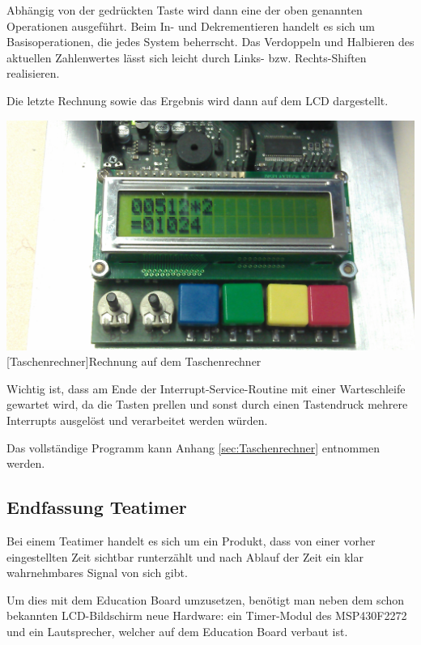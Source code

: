 \documentclass[12pt,a4paper,bibliography=totocnumbered,listof=totocnumbered]{scrartcl}
\begin{document}
\vspace{1em}


\vspace{1em}


Abhängig von der gedrückten Taste wird dann eine der oben genannten Operationen ausgeführt. Beim In- und Dekrementieren handelt es sich um Basisoperationen, die jedes System beherrscht. Das Verdoppeln und Halbieren des aktuellen Zahlenwertes lässt sich leicht durch Links- bzw. Rechts-Shiften realisieren.

Die letzte Rechnung sowie das Ergebnis wird dann auf dem LCD dargestellt.

\vspace{1em}
\begin{minipage}{\linewidth}
	\centering
	\includegraphics[width=0.7\linewidth]{img/Taschenrechner.jpg}
	[Taschenrechner]{Rechnung auf dem Taschenrechner}
	\label{fig:Taschenrechner}
\end{minipage}

Wichtig ist, dass am Ende der Interrupt-Service-Routine mit einer Warteschleife gewartet wird, da die Tasten prellen und sonst durch einen Tastendruck mehrere Interrupts ausgelöst und verarbeitet werden würden.

Das vollständige Programm kann Anhang \ref{sec:Taschenrechner} entnommen werden.

\pagebreak

\subsection{Endfassung Teatimer}
\label{VersuchTeatimer}
Bei einem Teatimer handelt es sich um ein Produkt, dass von einer vorher eingestellten Zeit sichtbar runterzählt und nach Ablauf der Zeit ein klar wahrnehmbares Signal von sich gibt.

Um dies mit dem Education Board umzusetzen, benötigt man neben dem schon bekannten LCD-Bildschirm neue Hardware: ein Timer-Modul des MSP430F2272 und ein Lautsprecher, welcher auf dem Education Board verbaut ist.
\end{document}
